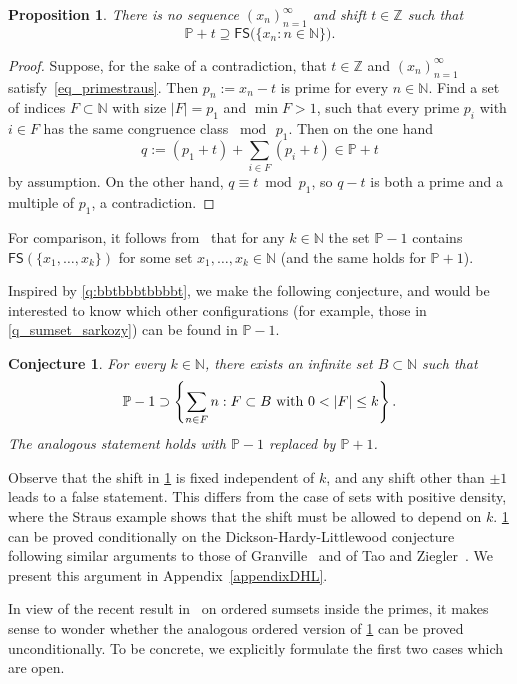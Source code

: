 \documentclass[10pt,dvipsnames]{article}
\newtheorem{proposition}[theorem]{Proposition}
\newtheorem{conjecture}[theorem]{Conjecture}
\theoremstyle{definition}
\theoremstyle{plain}
\renewcommand{\P}{\mathbb{P}}
\newcommand{\Z}{\mathbb{Z}}
\newcommand{\N}{\mathbb{N}}
\newcommand{\FS}{\mathsf{FS}}
\begin{document}
\begin{proposition}
\label{prop_noprimeshiftedIP}
There is no sequence $(x_n)_{n=1}^\infty$ and shift $t\in\Z$ such that
\begin{equation}\label{eq_primestraus}
    \P+t\supseteq \FS\big(\{x_n:n\in\N\}\big).
\end{equation}
\end{proposition}
\begin{proof}
Suppose, for the sake of a contradiction, that $t\in\Z$ and $(x_n)_{n=1}^\infty$ satisfy~\eqref{eq_primestraus}.
Then $p_n:=x_n-t$ is prime for every $n\in\N$. 
Find a set of indices $F\subset\N$ with size $|F|=p_1$ and $\min F>1$, such that every prime $p_i$ with $i\in F$ has the same 
congruence class $\bmod\,p_1$.
Then on the one hand 
$$q:=(p_1+t)+\sum_{i\in F}(p_i+t)\in\P+t$$
by assumption. 
On the other hand, $q\equiv t\bmod p_1$, so $q-t$ is both a prime and a multiple of $p_1$, a contradiction.
\end{proof}
For comparison, it follows from~\cite[Example 9]{Green_Tao10} that for any $k\in\N$ the set $\P-1$ contains $\FS(\{x_1,\ldots,x_k\})$ for some set $x_1,\ldots,x_k\in\N$ (and the same holds for $\P+1$).

Inspired by \cref{q:bbtbbbtbbbbt}, we make the following conjecture, and would be interested to know which other configurations (for example, those in \cref{q_sumset_sarkozy}) can be found in $\P - 1$.

\begin{conjecture}\label{conjecture_primestrueHindman}
    For every $k\in\N$, there exists an infinite set $B\subset\N$ such that 
    $$\P-1\supset \left\{ \sum_{n \in F}  n :   F \subset B\textup{ with } 0< |F| \leq k \right\}.$$
The analogous statement holds with $\P-1$ replaced by $\P+1$.
\end{conjecture}

Observe that the shift in \cref{conjecture_primestrueHindman} is fixed independent of $k$, and any shift other than $\pm1$ leads to a false statement.
This differs from the case of sets with positive density, where the Straus example shows that the shift must be allowed to depend on $k$.
\cref{conjecture_primestrueHindman} can be proved conditionally on the Dickson-Hardy-Littlewood conjecture following similar arguments to those of Granville~\cite{Granville90} and of Tao and Ziegler~\cite{TZ23}. We present this argument in Appendix~\ref{appendixDHL}.

In view of the recent result in~\cite{TZ23} on ordered sumsets inside the primes, it makes sense to wonder whether the analogous ordered version of \cref{conjecture_primestrueHindman} can be proved unconditionally. 
To be concrete, we explicitly formulate the first two cases which are  open.
\end{document}
